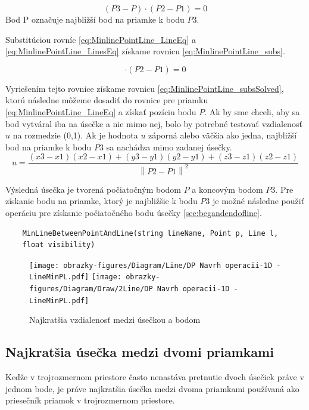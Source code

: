 \begin{equation}
    (P3-P)\cdot(P2-P1) =0 
    \label{eq:MinlinePointLine_LinesEq}
\end{equation}
Bod P označuje najbližší bod na priamke k bodu $P3$.

Substitúciou rovníc \ref{eq:MinlinePointLine_LineEq} a \ref{eq:MinlinePointLine_LinesEq} získame rovnicu \ref{eq:MinlinePointLine_subs}.

\begin{equation}
[P3 - P1 - u(P2-P1)] \cdot (P2 - P1) = 0
    \label{eq:MinlinePointLine_subs}
\end{equation}

Vyriešením tejto rovnice získame rovnicu \ref{eq:MinlinePointLine_subsSolved}, ktorú následne môžeme dosadiť do rovnice pre priamku \ref{eq:MinlinePointLine_LineEq} a získať pozíciu bodu $P$. Ak by sme chceli, aby sa bod vytváral iba na úsečke a nie mimo nej, bolo by potrebné testovať vzdialenosť $u$ na rozmedzie (0,1). Ak je hodnota $u$ záporná alebo väčšia ako jedna,  najbližší bod na priamke k bodu $P3$ sa nachádza mimo zadanej úsečky. 
\begin{equation}
u= \frac
{\left (x3 -x1  \right )\left (x2-x1  \right )
+\left (y3-y1  \right )\left (y2-y1  \right )
+\left (z3-z1  \right )\left (z2-z1  \right )}
{\left \| P2-P1 \right \|^{2}}
    \label{eq:MinlinePointLine_subsSolved}
\end{equation}


Výsledná úsečka je tvorená počiatočným bodom $P$ a koncovým bodom $P3$.
Pre získanie bodu na priamke, ktorý je najbližšie k bodu $P3$ je možné následne použiť operáciu pre získanie počiatočného bodu úsečky \ref{sec:begandendofline}.


\begin{lstlisting}
	MinLineBetweenPointAndLine(string lineName, Point p, Line l,
	float visibility)
\end{lstlisting}

\begin{figure}[H]
	\centering
	\texttt{[image: obrazky-figures/Diagram/Line/DP Navrh operacii-1D -  LineMinPL.pdf]}
	\texttt{[image: obrazky-figures/Diagram/Draw/2Line/DP Navrh operacii-1D -  LineMinPL.pdf]}
	\caption{Najkratšia vzdialenosť medzi úsečkou a bodom}
	\label{fig:1}
\end{figure}

\subsection{Najkratšia úsečka medzi dvomi priamkami}
Keďže v trojrozmernom priestore často nenastáva pretnutie dvoch úsečiek práve v jednom bode, je práve najkratšia úsečka medzi dvoma priamkami používaná ako priesečník priamok v trojrozmernom priestore.


